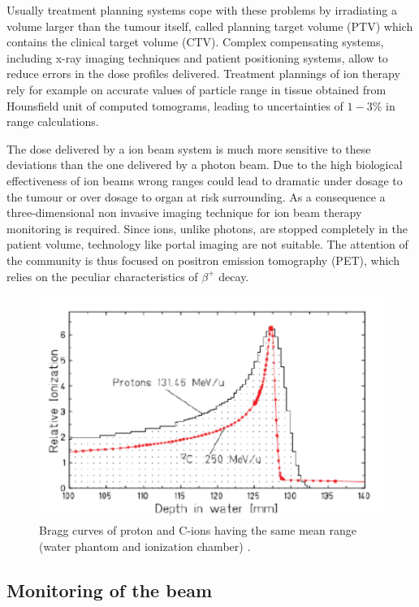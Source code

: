 Usually treatment planning systems cope with these problems by irradiating a volume larger than the tumour itself, called planning target volume (PTV) which contains the clinical target volume (CTV). Complex compensating systems, including x-ray imaging techniques and patient positioning systems, allow to reduce errors in the dose profiles delivered. 
Treatment plannings of ion therapy rely for example on accurate values of particle range in tissue obtained from Hounsfield unit of computed tomograms, leading to uncertainties of $1-3\%$ in range calculations\cite{Enghardt2004}.

The dose delivered by a ion beam system is much more sensitive to these deviations than the one delivered by a photon beam. Due to the high biological effectiveness of ion beams wrong ranges could lead to dramatic under dosage to the tumour or over dosage to organ at risk surrounding.
As a consequence a three-dimensional non invasive imaging technique for ion beam therapy monitoring is required. Since ions, unlike photons, are stopped completely in the patient volume, technology like portal imaging are not suitable. The attention of the community is thus focused on positron emission tomography (PET), which relies on the peculiar characteristics of $\beta ^{+}$ decay.

\begin{figure} 
\centering 
\includegraphics[width=12cm]{Pictures/Chapter_1/range_scatter.pdf}
\caption[Peak spread for Carbon]{Bragg curves of proton and C-ions having the same mean range (water phantom and ionization chamber) \cite{Schardt2007}.}
\label{fig:spread}
\end{figure}

\subsection{Monitoring of the beam}

